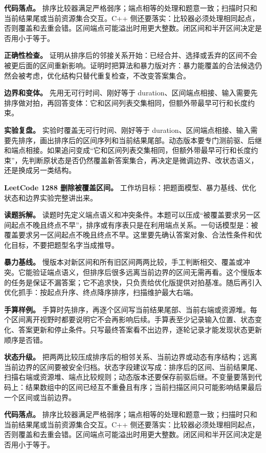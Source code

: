 \textbf{代码落点。} 排序比较器满足严格弱序；端点相等的处理和题意一致；扫描时只和当前结果尾或当前资源集合交互。C++ 侧还要落实：比较器必须处理相同起点，否则覆盖和去重会错。区间端点可能溢出时用更大整数。闭区间和半开区间决定是否用小于等于。

\textbf{正确性检查。} 证明从排序后的邻接关系开始：已经合并、选择或丢弃的区间不会被更后面的区间重新影响。证明时把算法和暴力版对齐：暴力能覆盖的合法候选仍然会被考虑，优化结构只替代重复检查，不改变答案集合。

\textbf{边界和变体。} 先用无可行时间、刚好等于 duration、区间端点相接、输入需要先排序做对拍，再回答变体：它和区间列表交集相同，但额外带最早可行和长度约束。

\textbf{实验复盘。} 实验时覆盖无可行时间、刚好等于 duration、区间端点相接、输入需要先排序，画出排序后的区间序列和当前结果尾部。动态版本要专门测前驱、后继和端点相接。如果追问变成“它和区间列表交集相同，但额外带最早可行和长度约束”，先判断原状态是否仍然覆盖新答案集合，再决定是微调边界、改状态语义，还是换成另一类结构。

\noindent\textbf{LeetCode 1288 删除被覆盖区间。} 工作坊目标：把题面模型、暴力基线、优化状态和边界实验完整讲出来。

\textbf{读题拆解。} 读题时先定义端点语义和冲突条件。本题可以压成“被覆盖要求另一区间起点不晚且终点不早”，排序或有序表只是在利用端点关系。一句话模型是：被覆盖要求另一区间起点不晚且终点不早。这里要先确认答案对象、合法性条件和优化目标，不要把题型名字当成推导。

\textbf{暴力基线。} 慢版本对新区间和所有旧区间两两比较，手工判断相交、覆盖或冲突。它能验证端点语义，但排序后很多远离当前边界的区间无需再看。这个慢版本的任务是保证不漏答案；它不追求快，只负责给优化版提供对拍基准。随后再引入优化抓手：按起点升序、终点降序排序，扫描维护最大右端。

\textbf{手算样例。} 手算时先排序，再逐个区间写当前结果尾部、当前右端或资源堆。每个区间离开视野时都要说明它不会再影响后续。手算表至少记录输入位置、状态变化、答案更新和停止条件。只写最终答案看不出边界，逐轮记录才能发现状态更新顺序是否错。

\textbf{状态升级。} 把两两比较压成排序后的相邻关系、当前边界或动态有序结构；远离当前边界的区间要被安全归档。状态字段建议写成：排序后的区间、当前结果尾、扫描右端或资源堆、端点比较规则；动态版本还要保存前驱后继。不变量要落到代码上：结果数组中的区间已经互不重叠且有序；当前扫描区间只可能影响结果最后一个区间或当前边界。

\textbf{代码落点。} 排序比较器满足严格弱序；端点相等的处理和题意一致；扫描时只和当前结果尾或当前资源集合交互。C++ 侧还要落实：比较器必须处理相同起点，否则覆盖和去重会错。区间端点可能溢出时用更大整数。闭区间和半开区间决定是否用小于等于。

